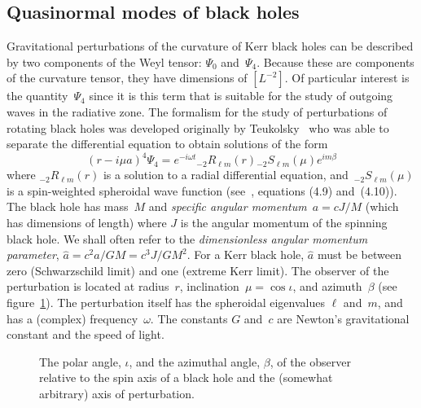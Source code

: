 \subsection{Quasinormal modes of black holes}
\label{ss:Quasimodo}
Gravitational perturbations of the curvature of Kerr black holes can be
described by two components of the Weyl tensor: $\Psi_0$ and~$\Psi_4$.
Because these are components of the curvature tensor, they have dimensions
of $[L^{-2}]$.
Of particular interest is the quantity~$\Psi_4$ since it is this term that is
suitable for the study of outgoing waves in the radiative zone.  The
formalism for the study of perturbations of rotating black holes was
developed originally by Teukolsky~\cite{teukolsky:1973} who was able
to separate the differential equation to obtain solutions of the form
\begin{equation}
  (r-i\mu a)^4\Psi_4 = e^{-i\omega t} {}_{-2}R_{\ell m}(r)
                       {}_{-2}S_{\ell m}(\mu) e^{im\beta}
  \label{e:perturbation mode}
\end{equation}
where ${}_{-2}R_{\ell m}(r)$ is a solution to a radial differential
equation, and~${}_{-2}S_{\ell m}(\mu)$ is a spin-weighted spheroidal wave
function (see~\cite{teukolsky:1973}, equations (4.9) and~(4.10)).
The black hole has mass~$M$ and \emph{specific angular momentum}~$a=cJ/M$
(which has dimensions of length) where $J$ is the angular momentum of the
spinning black hole.  We shall often refer to the
\emph{dimensionless angular momentum parameter}, $\hat{a}=c^2a/GM=c^3J/GM^2$.
For a Kerr black hole, $\hat{a}$ must be between zero (Schwarzschild limit)
and one (extreme Kerr limit).
The observer of the perturbation is located at radius~$r$,
inclination~$\mu=\cos\iota$, and azimuth~$\beta$
(see figure~\ref{f:orient}).  The perturbation
itself has the spheroidal eigenvalues $\ell$ and~$m$, and has a
(complex) frequency~$\omega$.  The constants $G$ and~$c$ are Newton's
gravitational constant and the speed of light.

\begin{figure}[h]
\begin{center}
\caption{\label{f:orient} The polar angle, $\iota$, and the azimuthal angle,
  $\beta$, of the observer relative to the spin axis of a black hole and
  the (somewhat arbitrary) axis of perturbation.}
\end{center}
\end{figure}

